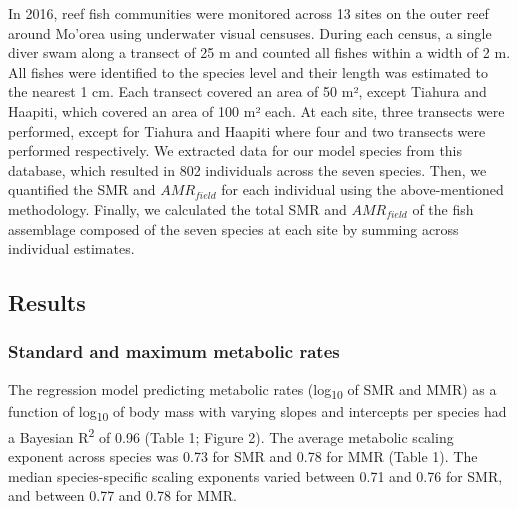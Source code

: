 \documentclass[
]{article}
\begin{document}
In 2016, reef fish communities were monitored across 13 sites on the
outer reef around Mo'orea using underwater visual censuses. During each
census, a single diver swam along a transect of 25 m and counted all
fishes within a width of 2 m. All fishes were identified to the species
level and their length was estimated to the nearest 1 cm. Each transect
covered an area of 50 m², except Tiahura and Haapiti, which covered an
area of 100 m² each. At each site, three transects were performed,
except for Tiahura and Haapiti where four and two transects were
performed respectively. We extracted data for our model species from
this database, which resulted in 802 individuals across the seven
species. Then, we quantified the SMR and \(AMR_{field}\) for each
individual using the above-mentioned methodology. Finally, we calculated
the total SMR and \(AMR_{field}\) of the fish assemblage composed of the
seven species at each site by summing across individual estimates.

\hypertarget{results}{%
\subsection{Results}\label{results}}

\hypertarget{standard-and-maximum-metabolic-rates}{%
\subsubsection{Standard and maximum metabolic
rates}\label{standard-and-maximum-metabolic-rates}}

\noindent The regression model predicting metabolic rates
(log\textsubscript{10} of SMR and MMR) as a function of
log\textsubscript{10} of body mass with varying slopes and intercepts
per species had a Bayesian R\textsuperscript{2} of 0.96 (Table 1; Figure
2). The average metabolic scaling exponent across species was 0.73 for
SMR and 0.78 for MMR (Table 1). The median species-specific scaling
exponents varied between 0.71 and 0.76 for SMR, and between 0.77 and
0.78 for MMR.

\providecommand{\docline}[3]{\noalign{\global\setlength{\arrayrulewidth}{#1}}\arrayrulecolor[HTML]{#2}\cline{#3}}

\setlength{\tabcolsep}{2pt}

\renewcommand*{\arraystretch}{1.5}
\end{document}
